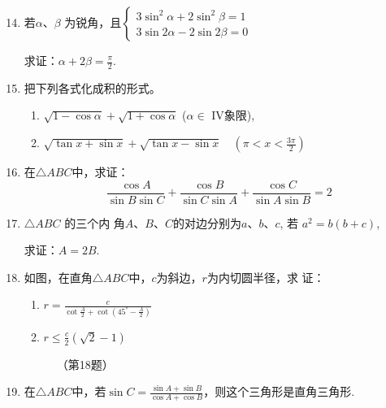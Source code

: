 \begin{enumerate}\setcounter{enumi}{13}
    \item 若$\alpha$、$\beta$ 为锐角，且$\begin{cases}
        3\sin^{2}\alpha+2\sin^{2}\beta=1\\
        3\sin2\alpha-2\sin2\beta=0
    \end{cases}$

求证：$\alpha+2\beta=\frac{\pi}{2}$.

\item 把下列各式化成积的形式。
\begin{enumerate}[(1)]
    \item $\sqrt {1- \cos \alpha }+ \sqrt {1+ \cos \alpha}$  ($\alpha\in$ IV象限),
    \item $\sqrt {\tan x+ \sin x}+ \sqrt {\tan x- \sin x}\quad \left ( \pi < x< \frac {3\pi }2\right ) $
\end{enumerate}
\item 在$\triangle ABC$中，求证：
$$\frac{\cos A}{\sin B\sin C}+\frac{\cos B}{\sin C\sin A}+\frac{\cos C}{\sin A\sin B}=2$$
\item $\triangle ABC$ 的三个内 角$A$、$B$、$C$的对边分别为$a$、$b$、$c$, 若
$a^{2}=b\left(b+c\right)$,

求证：$A=2B$.

\item 如图，在直角$\triangle ABC$中，$c$为斜边，$r$为内切圆半径，求
证：
\begin{enumerate}[(1)]
    \item $r=\frac{c}{\cot\frac{A}{2}+\cot\left(45^{\circ}-\frac{A}{2}\right)}$
    \item $r\le \frac{c}{2}\left(\sqrt{2}-1\right)$
\end{enumerate}

\begin{figure}[htp]
    \centering
{}
    \caption*{（第18题）}
\end{figure}

\item 在$\triangle ABC$中，若$\sin C=\frac{\sin A+\sin B}{\cos A+\cos B}$，则这个三角形是直角三角形.


\end{enumerate}
